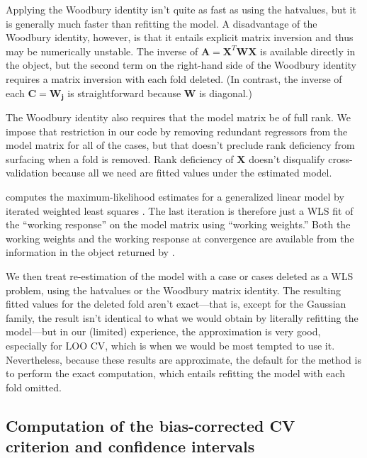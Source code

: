 \documentclass[
]{jss}
\begin{document}
Applying the Woodbury identity isn't quite as fast as using the
hatvalues, but it is generally much faster than refitting the model. A
disadvantage of the Woodbury identity, however, is that it entails
explicit matrix inversion and thus may be numerically unstable. The
inverse of \(\mathbf{A} = \mathbf{X}^T \mathbf{W} \mathbf{X}\) is
available directly in the  object, but the second term on the
right-hand side of the Woodbury identity requires a matrix inversion
with each fold deleted. (In contrast, the inverse of each
\(\mathbf{C} = \mathbf{W}_\mathbf{j}\) is straightforward because
\(\mathbf{W}\) is diagonal.)

The Woodbury identity also requires that the model matrix be of full
rank. We impose that restriction in our code by removing redundant
regressors from the model matrix for all of the cases, but that doesn't
preclude rank deficiency from surfacing when a fold is removed. Rank
deficiency of \(\mathbf{X}\) doesn't disqualify cross-validation because
all we need are fitted values under the estimated model.

 computes the maximum-likelihood estimates for a generalized
linear model by iterated weighted least squares \citep[see, e.g.,][Sec.
6.12]{FoxWeisberg:2019}. The last iteration is therefore just a WLS fit
of the ``working response'' on the model matrix using ``working
weights.'' Both the working weights and the working response at
convergence are available from the information in the object returned by
.

We then treat re-estimation of the model with a case or cases deleted as
a WLS problem, using the hatvalues or the Woodbury matrix identity. The
resulting fitted values for the deleted fold aren't exact---that is,
except for the Gaussian family, the result isn't identical to what we
would obtain by literally refitting the model---but in our (limited)
experience, the approximation is very good, especially for LOO CV, which
is when we would be most tempted to use it. Nevertheless, because these
results are approximate, the default for the  
method is to perform the exact computation, which entails refitting the
model with each fold omitted.

\subsection{Computation of the bias-corrected CV criterion and
confidence
intervals}\label{computation-of-the-bias-corrected-cv-criterion-and-confidence-intervals}
\end{document}
